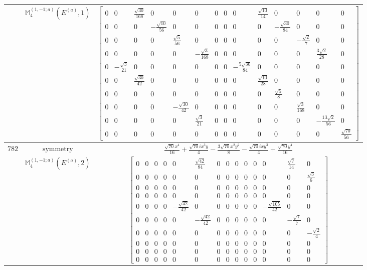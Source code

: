 \documentclass[fleqn,8pt,landscape]{jsarticle}
\begin{document}
\begin{longtable}{ccc}
$  $ & $ \mathbb{M}_{4}^{(1,-1;a)}(E^{(a)},1) $ & $ \begin{bmatrix} 0 & 0 & \frac{\sqrt{30}}{168} & 0 & 0 & 0 & 0 & 0 & 0 & \frac{\sqrt{10}}{14} & 0 & 0 & 0 & 0 \\ 0 & 0 & 0 & - \frac{\sqrt{10}}{56} & 0 & 0 & 0 & 0 & 0 & 0 & - \frac{\sqrt{30}}{84} & 0 & 0 & 0 \\ 0 & 0 & 0 & 0 & \frac{\sqrt{5}}{56} & 0 & 0 & 0 & 0 & 0 & 0 & - \frac{\sqrt{2}}{7} & 0 & 0 \\ 0 & 0 & 0 & 0 & 0 & - \frac{\sqrt{3}}{168} & 0 & 0 & 0 & 0 & 0 & 0 & \frac{3 \sqrt{2}}{28} & 0 \\ 0 & - \frac{\sqrt{3}}{21} & 0 & 0 & 0 & 0 & 0 & 0 & - \frac{5 \sqrt{30}}{84} & 0 & 0 & 0 & 0 & 0 \\ 0 & 0 & \frac{\sqrt{30}}{42} & 0 & 0 & 0 & 0 & 0 & 0 & \frac{\sqrt{10}}{28} & 0 & 0 & 0 & 0 \\ 0 & 0 & 0 & 0 & 0 & 0 & 0 & 0 & 0 & 0 & \frac{\sqrt{5}}{8} & 0 & 0 & 0 \\ 0 & 0 & 0 & 0 & - \frac{\sqrt{30}}{42} & 0 & 0 & 0 & 0 & 0 & 0 & \frac{\sqrt{3}}{168} & 0 & 0 \\ 0 & 0 & 0 & 0 & 0 & \frac{\sqrt{3}}{21} & 0 & 0 & 0 & 0 & 0 & 0 & - \frac{13 \sqrt{2}}{56} & 0 \\ 0 & 0 & 0 & 0 & 0 & 0 & 0 & 0 & 0 & 0 & 0 & 0 & 0 & \frac{\sqrt{70}}{56} \end{bmatrix} $ \\ \hline
$ 782 $ & $ \text{symmetry} $ & $ \frac{\sqrt{70} x^{4}}{16} + \frac{\sqrt{70} i x^{3} y}{4} - \frac{3 \sqrt{70} x^{2} y^{2}}{8} - \frac{\sqrt{70} i x y^{3}}{4} + \frac{\sqrt{70} y^{4}}{16} $ \\
$  $ & $ \mathbb{M}_{4}^{(1,-1;a)}(E^{(a)},2) $ & $ \begin{bmatrix} 0 & 0 & 0 & 0 & 0 & \frac{\sqrt{42}}{84} & 0 & 0 & 0 & 0 & 0 & 0 & \frac{\sqrt{7}}{14} & 0 \\ 0 & 0 & 0 & 0 & 0 & 0 & 0 & 0 & 0 & 0 & 0 & 0 & 0 & \frac{\sqrt{3}}{6} \\ 0 & 0 & 0 & 0 & 0 & 0 & 0 & 0 & 0 & 0 & 0 & 0 & 0 & 0 \\ 0 & 0 & 0 & 0 & 0 & 0 & 0 & 0 & 0 & 0 & 0 & 0 & 0 & 0 \\ 0 & 0 & 0 & 0 & - \frac{\sqrt{42}}{42} & 0 & 0 & 0 & 0 & 0 & 0 & - \frac{\sqrt{105}}{42} & 0 & 0 \\ 0 & 0 & 0 & 0 & 0 & - \frac{\sqrt{42}}{42} & 0 & 0 & 0 & 0 & 0 & 0 & - \frac{\sqrt{7}}{7} & 0 \\ 0 & 0 & 0 & 0 & 0 & 0 & 0 & 0 & 0 & 0 & 0 & 0 & 0 & - \frac{\sqrt{2}}{4} \\ 0 & 0 & 0 & 0 & 0 & 0 & 0 & 0 & 0 & 0 & 0 & 0 & 0 & 0 \\ 0 & 0 & 0 & 0 & 0 & 0 & 0 & 0 & 0 & 0 & 0 & 0 & 0 & 0 \\ 0 & 0 & 0 & 0 & 0 & 0 & 0 & 0 & 0 & 0 & 0 & 0 & 0 & 0 \end{bmatrix} $ \\ \hline

\end{longtable}
\end{document}
